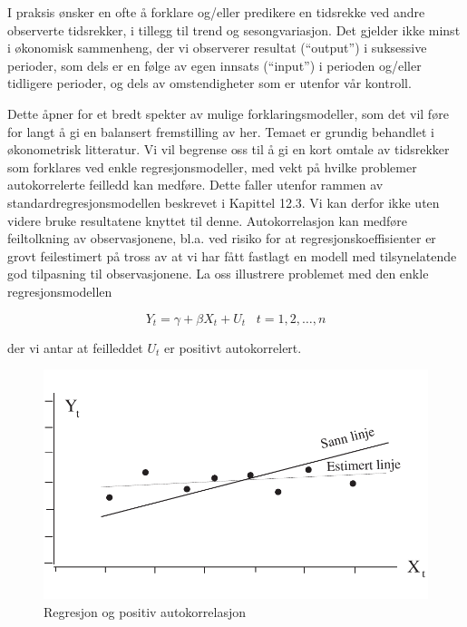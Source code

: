 I praksis ønsker en ofte å forklare og/eller predikere en tidsrekke
ved andre observerte tidsrekker, i tillegg til trend og sesongvariasjon.
Det gjelder ikke minst i økonomisk sammenheng, der vi observerer resultat
(``output'') i suksessive perioder, som dels er en følge av egen innsats
(``input'') i perioden og/eller tidligere perioder, og dels av omstendigheter
som er utenfor vår kontroll.

Dette åpner for et bredt spekter av mulige  forklaringsmodeller, som det
vil føre for langt å gi en balansert fremstilling av her. Temaet er
grundig behandlet i økonometrisk litteratur. Vi vil begrense oss til
å gi en kort omtale av tidsrekker som forklares ved enkle
regresjonsmodeller, med vekt på hvilke problemer autokorrelerte feilledd
kan medføre. Dette faller utenfor rammen av standardregresjonsmodellen 
beskrevet i Kapittel 12.3.
Vi kan derfor ikke uten videre bruke resultatene knyttet til denne.
Auto\-korrelasjon kan medføre feiltolkning av observasjonene, bl.a. ved 
risiko for at regresjonskoeffisienter er grovt feil\-esti\-mert på tross av
at vi har fått fastlagt en modell med
tilsynelatende god tilpasning til observasjonene.
La oss illustrere problemet med den enkle regresjonsmodellen

\[ Y_t=\gamma + \beta X_t + U_t  \; \; \; t=1,2, \ldots ,n  \]

\noindent der vi antar at feilleddet $U_t$ er positivt autokorrelert.

\begin{figure}[ht]
\centering
   \includegraphics[scale=0.7]{figurer/fig13_10.pdf} 
 \caption{Regresjon og positiv autokorrelasjon}
	\label{fig:regresjon_acf}
\end{figure}

